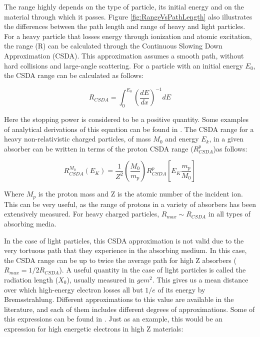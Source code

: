 The range highly depends on the type of particle, its initial energy and on the material through which it passes. Figure \ref{fig:RangeVsPathLength} also illustrates the differences between the path length and range of heavy and light particles. For a heavy particle that losses energy through ionization and atomic excitation, the range (R) can be calculated through the Continuous Slowing Down Approximation (CSDA). This approximation assumes a smooth path, without hard collisions and large-angle scattering. For a particle with an initial energy $E_0$, the CSDA range can be calculated as follows: 

\begin{equation}
    R_{CSDA} = \int_{0}^{E_0} \left( \frac{dE}{dx} \right)^{-1} dE
    \label{eq:rangeCSDA}
\end{equation}

Here the stopping power is considered to be a positive quantity. Some examples of analytical derivations of this equation can be found in \parencite*[][]{ref:CSDA}. The CSDA range for a heavy non-relativistic charged particles, of mass $M_0$ and energy $E_k$, in a given absorber can be written in terms of the proton CSDA range ($R^{p}_{CSDA}$)as follows: 

\begin{equation}
    R_{CSDA}^{M_0} \left( E_K \right)= \frac{1}{Z^2} \left(\frac{M_0}{m_p}\right) R_{CSDA}^{p}\left[ E_K \frac{m_p}{M_0}\right]
\end{equation}

Where $M_p$ is the proton mass and Z is the atomic number of the incident ion. This can be very useful, as the range of protons in a variety of absorbers has been extensively measured. For heavy charged particles, $R_{max} \sim R_{CSDA}$ in all types of absorbing media. 

In the case of light particles, this CSDA approximation is not valid due to the very tortuous path that they experience in the absorbing medium. In this case, the CSDA range can be up to twice the average path for high Z absorbers ($R_{max} = 1/2 R_{CSDA}$). A useful quantity in the case of light particles is called the radiation length ($X_0$), usually measured in $g cm^2$. This gives us a mean distance over which high-energy electron losses all but $1/e$ of its energy by Bremsstrahlung. Different approximations to this value are available in the literature, and each of them includes different degrees of approximations. Some of this expressions can be found in \parencite*[][]{ref:radiationLength}. Just as an example, this would be an expression for high energetic electrons in high Z materials: 

